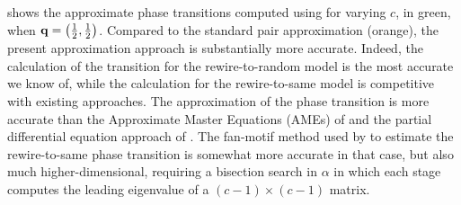 \documentclass[review, onefignum, onetabnum]{siamart171218}
\begin{document}
		 shows the approximate phase transitions computed using  for varying $c$, in green, when $\mathbf{q} = \left(\frac{1}{2}, \frac{1}{2}\right)$. %
		Compared to the standard pair approximation (orange), the present approximation approach is substantially more accurate.
		Indeed, the calculation of the transition for the rewire-to-random model is the most accurate we know of, while the calculation for the rewire-to-same model is competitive with existing approaches.
		The approximation of the phase transition is more accurate than the Approximate Master Equations (AMEs) of \cite{Durrett2012} and the partial differential equation approach of \cite{Silk2014}. 
		The fan-motif method used by \cite{Bohme2011} to estimate the rewire-to-same phase transition is somewhat more accurate in that case, but also much higher-dimensional, requiring a bisection search in $\alpha$ in which each stage computes the leading eigenvalue of a $(c-1)\times (c-1)$ matrix. 
\end{document}

